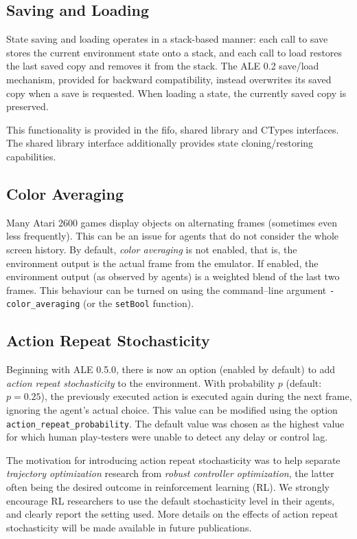 \documentclass[12pt]{article}
\begin{document}
\subsection{Saving and Loading} 

State saving and loading operates in a stack-based manner: each call to save stores the current
environment state onto a stack, and each call to load restores the last saved copy and removes
it from the stack. The ALE 0.2 save/load mechanism, provided for backward compatibility, instead
overwrites its saved copy when a save is requested. When loading a state, the currently saved copy
is preserved. 

This functionality is provided in the fifo, shared library and CTypes interfaces. The shared
library interface additionally provides state cloning/restoring capabilities.

\subsection{Color Averaging}

Many Atari 2600 games display objects on alternating frames (sometimes even less frequently).
This can be an issue for agents that do not consider the whole screen history.
By default, \emph{color averaging} is not enabled, that is, the environment output is the actual frame from the emulator.
If enabled, the environment output (as observed by agents) is a weighted blend of the last two frames.
This behaviour can be turned on using the command--line argument \verb+-color_averaging+ (or the \verb+setBool+ function).

\subsection{Action Repeat Stochasticity}

Beginning with ALE 0.5.0, there is now an option (enabled by default) to add 
\emph{action repeat stochasticity} to the environment. With probability $p$ (default: $p = 0.25$),
the previously executed action is executed again during the next frame, ignoring the agent's
actual choice. This value can be modified using the option \verb+action_repeat_probability+.
The default value was chosen as the highest value for which human play-testers
were unable to detect any delay or control lag.

The motivation for introducing action repeat stochasticity was to help separate \emph{trajectory
optimization} research from \emph{robust controller optimization}, the latter often being the 
desired outcome in reinforcement learning (RL). We strongly encourage RL researchers to use 
the default stochasticity level in their agents, and clearly report the setting used. More 
details on the effects of action repeat stochasticity will be made available in future 
publications.
\end{document}
